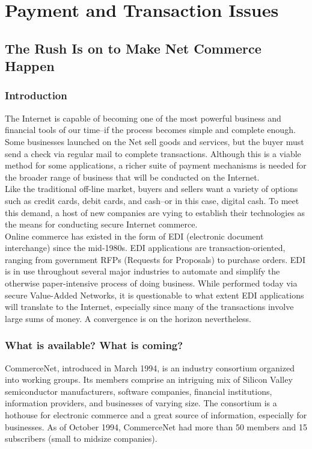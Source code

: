 \chapter{Payment and Transaction Issues}

\section{The Rush Is on to Make Net Commerce Happen}
\label{rush_commerce}

\subsection{Introduction}
The Internet is capable of becoming one of the most powerful business
and financial tools of our time--if the process becomes simple and
complete enough. Some businesses launched on the Net sell goods and
services, but the buyer must send a check via regular mail to complete
transactions. Although this is a viable method for some applications, a
richer suite of payment mechanisms is needed for the broader range of
business that will be conducted on the Internet.\\

Like the traditional off-line market, buyers and sellers want a variety
of options such as credit cards, debit cards, and cash--or in this
case, digital cash. To meet this demand, a host of new companies are
vying to establish their technologies as the means for conducting
secure Internet commerce.\\

Online commerce has existed in the form of EDI (electronic document
interchange) since the mid-1980s. EDI applications are
transaction-oriented, ranging from government RFPs (Requests for
Proposals) to purchase orders. EDI is in use throughout several major
industries to automate and simplify the otherwise paper-intensive
process of doing business. While performed today via secure Value-Added
Networks, it is questionable to what extent EDI applications will
translate to the Internet, especially since many of the transactions
involve large sums of money. A convergence is on the horizon
nevertheless.\\

\subsection{What is available? What is coming?}
CommerceNet, introduced in March 1994, is an industry consortium
organized into working groups. Its members comprise an intriguing mix
of Silicon Valley semiconductor manufacturers, software companies,
financial institutions, information providers, and businesses of
varying size. The consortium is a hothouse for electronic commerce and
a great source of information, especially for businesses. As of October
1994, CommerceNet had more than 50 members and 15 subscribers (small to
midsize companies).\\

